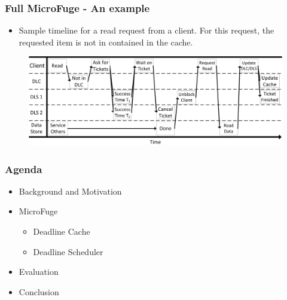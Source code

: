 \documentclass{beamer}
\begin{document}
\begin{frame}
  \frametitle{Full MicroFuge - An example}
  \begin{itemize}
  \item Sample timeline for a read request from a client. For this request,
    the requested item is not in contained in the cache.
  \end{itemize}

  \begin{figure}
    \begin{center}
      \centerline{\includegraphics[scale=0.60]{img/RequestTimelineHorizontal.png}}
    \end{center}
  \end{figure}
\end {frame}

\begin{frame}
  \frametitle{Agenda}
  \begin{itemize}
  \item[\Checkmark] Background and Motivation
  \item[\Checkmark] MicroFuge
    \begin{itemize}
    \item Deadline Cache
    \item Deadline Scheduler
    \end{itemize}
  \item Evaluation
  \item Conclusion
  \end{itemize}
\end{frame}
\end{document}
